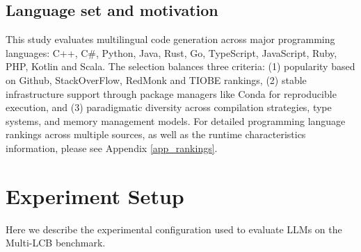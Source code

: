 \documentclass{article} %
\begin{document}
\subsection{Language set and motivation}

This study evaluates multilingual code generation across major programming languages: C++, C\#, Python, Java, Rust, Go, TypeScript, JavaScript, Ruby, PHP, Kotlin and Scala. The selection balances three criteria: (1) popularity based on Github, StackOverFlow, RedMonk and TIOBE rankings, (2) stable infrastructure support through package managers like Conda for reproducible execution, and (3) paradigmatic diversity across compilation strategies, type systems, and memory management models. For detailed programming language rankings across multiple sources, as well as the runtime characteristics information, please see Appendix \ref{app_rankings}.
















\section{Experiment Setup}
\label{sec_exp_setup}

Here we describe the experimental configuration used to evaluate LLMs on the Multi-LCB benchmark.  
\end{document}
